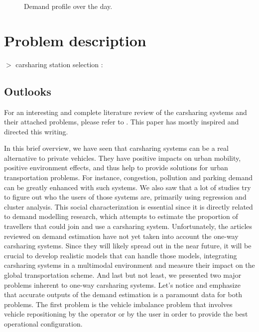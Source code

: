 \begin{bibunit}[ieeetr]
\begin{figure}[t]
\centering

\caption{Demand profile over the day.}
\label{fig:plotDemandProfile}
\end{figure}

\newpage
\section{Problem description}
$>$ carsharing station selection : \cite{ion_site_2009}

\subsection{Outlooks}
For an interesting and complete literature review of the carsharing systems and their attached problems, please refer to \cite{jorge_carsharing_2013}.
This paper has mostly inspired and directed this writing.


In this brief overview, we have seen that carsharing systems can be a real alternative to private vehicles.
They have positive impacts on urban mobility, positive environment effects, and thus help to provide solutions for urban transportation problems.
For instance, congestion, pollution and parking demand can be greatly enhanced with such systems.
We also saw that a lot of studies try to figure out who the users of those systems are, primarily
using regression and cluster analysis.
This social characterization is essential since it is directly related to demand modelling research, which attempts to estimate the proportion of
travellers that could join and use a carsharing system.
Unfortunately, the articles reviewed on demand estimation have not yet taken into account the one-way carsharing systems.
Since they will likely spread out in the near future, it will be crucial to develop realistic models that can handle those models, integrating carsharing systems in a multimodal environment and measure their impact on the global transportation scheme.
And last but not least, we presented two major problems inherent to one-way carsharing systems.
Let's notice and emphasize that accurate outputs of the demand estimation is a paramount data for both problems.
The first problem is the vehicle imbalance problem that involves vehicle repositioning by the operator or by the user in order to provide the best operational configuration.


\end{bibunit}
